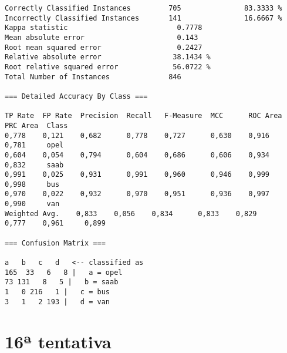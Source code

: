 \documentclass[
	article,			%
	11pt,				%
	oneside,			%
	a4paper,			%
	english,			%
	brazil,				%
	sumario=tradicional
	]{abntex2}
\begin{document}
\begin{lstlisting}
Correctly Classified Instances         705               83.3333 %
Incorrectly Classified Instances       141               16.6667 %
Kappa statistic                          0.7778
Mean absolute error                      0.143 
Root mean squared error                  0.2427
Relative absolute error                 38.1434 %
Root relative squared error             56.0722 %
Total Number of Instances              846     

=== Detailed Accuracy By Class ===

TP Rate  FP Rate  Precision  Recall   F-Measure  MCC      ROC Area  PRC Area  Class
0,778    0,121    0,682      0,778    0,727      0,630    0,916     0,781     opel
0,604    0,054    0,794      0,604    0,686      0,606    0,934     0,832     saab
0,991    0,025    0,931      0,991    0,960      0,946    0,999     0,998     bus
0,970    0,022    0,932      0,970    0,951      0,936    0,997     0,990     van
Weighted Avg.    0,833    0,056    0,834      0,833    0,829      0,777    0,961     0,899     

=== Confusion Matrix ===

a   b   c   d   <-- classified as
165  33   6   8 |   a = opel
73 131   8   5 |   b = saab
1   0 216   1 |   c = bus
3   1   2 193 |   d = van
\end{lstlisting}

\newpage

\section{16ª tentativa}
\end{document}
